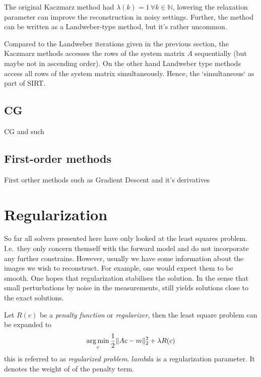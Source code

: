 The original Kaczmarz method had \(\lambda(k) = 1\, \forall k \in \mathbb{N}\), lowering the
relaxation parameter can improve the reconstruction in noisy settings. Further, the method can be
written as a Landweber-type method\cite{hansen_discrete_2010}, but it's rather uncommon.

Compared to the Landweber iterations given in the previous section, the Kaczmarz methods accesses
the rows of the system matrix \(A\) sequentially (but maybe not in ascending order). On the other
hand Landweber type methods access all rows of the system matrix simultaneously. Hence, the
`simultaneous` as part of SIRT\@.



\subsection{CG}\label{subsec:conjuage_gradient}

CG and such

\subsection{First-order methods}\label{subsec:first_order_methods}

First orther methods such as Gradient Descent and it's derivatives

\section{Regularization}\label{sec:regularization}

So far all solvers presented here have only looked at the least squares problem. I.e.\ they only
concern themself with the forward model and do not incorporate any further constrains. However,
usually we have some information about the images we wish to reconstruct. For example, one would
expect them to be smooth. One hopes that regularization stabilises the solution. In the sense that
small perturbations by noise in the measurements, still yields solutions close to the exact
solutions.

\begin{definition}\label{def:regularized_problem}
	Let \(R(c)\) be a \textit{penalty function} or \textit{regularizer}, then the least square
	problem can be expanded to
	\[
		\operatorname*{arg\,min}_c \frac{1}{2} \lVert A c - m\rVert_2^2 + \lambda R(c)
	\]
	this is referred to as \textit{regularized problem}. \(lambda\) is a regularization
	parameter. It denotes the weight of of the penalty term.
\end{definition}

